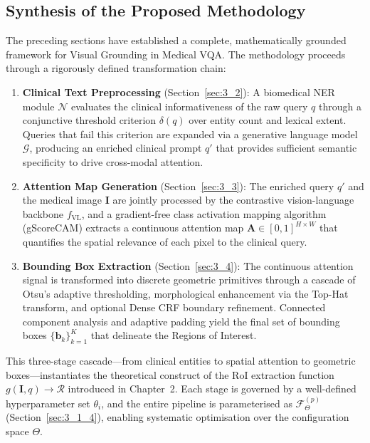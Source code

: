 \subsection{Synthesis of the Proposed Methodology}

The preceding sections have established a complete, mathematically grounded framework for Visual Grounding in Medical VQA. The methodology proceeds through a rigorously defined transformation chain:

\begin{enumerate}
    \item \textbf{Clinical Text Preprocessing} (Section~\ref{sec:3_2}): A biomedical NER module $\mathcal{N}$ evaluates the clinical informativeness of the raw query $q$ through a conjunctive threshold criterion $\delta(q)$ over entity count and lexical extent. Queries that fail this criterion are expanded via a generative language model $\mathcal{G}$, producing an enriched clinical prompt $q'$ that provides sufficient semantic specificity to drive cross-modal attention.

    \item \textbf{Attention Map Generation} (Section~\ref{sec:3_3}): The enriched query $q'$ and the medical image $\mathbf{I}$ are jointly processed by the contrastive vision-language backbone $f_{\text{VL}}$, and a gradient-free class activation mapping algorithm (gScoreCAM) extracts a continuous attention map $\mathbf{A} \in [0,1]^{H \times W}$ that quantifies the spatial relevance of each pixel to the clinical query.

    \item \textbf{Bounding Box Extraction} (Section~\ref{sec:3_4}): The continuous attention signal is transformed into discrete geometric primitives through a cascade of Otsu's adaptive thresholding, morphological enhancement via the Top-Hat transform, and optional Dense CRF boundary refinement. Connected component analysis and adaptive padding yield the final set of bounding boxes $\{\mathbf{b}_k\}_{k=1}^{K}$ that delineate the Regions of Interest.
\end{enumerate}

This three-stage cascade---from clinical entities to spatial attention to geometric boxes---instantiates the theoretical construct of the RoI extraction function $g(\mathbf{I}, q) \to \mathcal{R}$ introduced in Chapter~2. Each stage is governed by a well-defined hyperparameter set $\theta_i$, and the entire pipeline is parameterised as $\mathcal{F}_{\Theta}^{(p)}$ (Section~\ref{sec:3_1_4}), enabling systematic optimisation over the configuration space $\Theta$.

